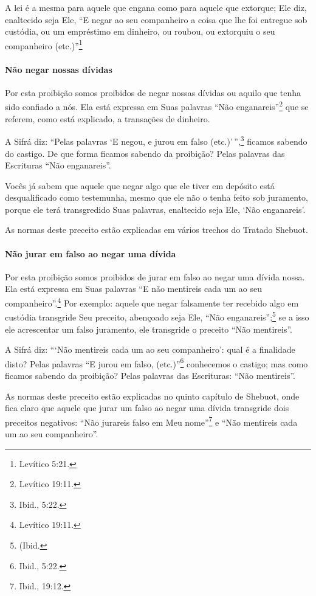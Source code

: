 A lei é a mesma para aquele que engana como para aquele que extorque;
Ele diz, enaltecido seja Ele, ``E negar ao seu companheiro a coisa que
lhe foi entregue sob custódia, ou um empréstimo em dinheiro, ou roubou,
ou extorquiu o seu companheiro (etc.)''\footnote{Levítico 5:21.}

\paragraph{Não negar nossas dívidas}

Por esta proibição somos proibidos de negar nossas dívidas ou aquilo
que tenha sido confiado a nós. Ela está expressa em Suas palavras ``Não
enganareis''\footnote{Levítico 19:11.} que se referem, como está explicado, a
transações de dinheiro.

A Sifrá diz: ``Pelas palavras `E negou, e jurou em falso (etc.)'\,'',\footnote{Ibid., 5:22.} ficamos sabendo do castigo. De que forma ficamos sabendo
da proibição? Pelas palavras das Escrituras ``Não enganareis''.

Vocês já sabem que aquele que negar algo que ele tiver em depósito está
desqualificado como testemunha, mesmo que ele não o tenha feito sob
juramento, porque ele terá transgredido Suas palavras, enaltecido seja
Ele, `Não enganareis'.

As normas deste preceito estão explicadas em vários trechos do Tratado
Shebuot.

\paragraph{Não jurar em falso ao negar uma dívida}

Por esta proibição somos proibidos de jurar em falso ao negar uma dívida
nossa. Ela está expressa em Suas palavras ``E não mentireis cada um ao
seu companheiro''.\footnote{Levítico 19:11.} Por exemplo: aquele que negar
falsamente ter recebido algo em custódia transgride Seu preceito,
abençoado seja Ele, ``Não enganareis'';\footnote{(Ibid.} se a isso ele
acrescentar um falso juramento, ele transgride o preceito ``Não
mentireis''.

A Sifrá diz: ```Não mentireis cada um ao seu companheiro': qual é a
finalidade disto? Pelas palavras ``E jurou em falso, (etc.)''\footnote{Ibid.,
5:22.} conhecemos o castigo; mas como ficamos sabendo da proibição? Pelas
palavras das Escrituras: ``Não mentireis''.

As normas deste preceito estão explicadas no quinto capítulo de
Shebuot, onde fica claro que aquele que jurar um falso ao negar uma
dívida transgride dois preceitos negativos: ``Não jurareis falso em Meu
nome''\footnote{Ibid., 19:12.} e ``Não mentireis cada um ao seu companheiro''.

